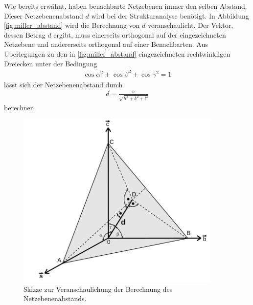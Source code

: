 Wie bereits erwähnt, haben benachbarte Netzebenen immer
den selben Abstand. Dieser Netzebenenabstand $d$ wird bei der
Strukturanalyse benötigt. In Abbildung \ref{fig:miller_abstand} wird
die Berechnung von $d$ veranschaulicht. Der Vektor, dessen Betrag $d$ ergibt,
muss einerseits orthogonal auf der eingezeichneten Netzebene und andererseits orthogonal
auf einer Benachbarten. Aus Überlegungen zu den in \ref{fig:miller_abstand}
eingezeichneten rechtwinkligen Dreiecken unter der Bedingung
\begin{align}
  \label{eqn:4}
  \cos\alpha^2 + \cos\beta^2 + \cos\gamma^2 = 1
\end{align}
lässt sich der Netzebenenabstand
durch
\begin{align}
  \label{eqn:5}
  d = \frac{a}{\sqrt{h^2 + k^2 + l^2}}
\end{align}
berechnen.

\begin{figure}[hhh]
  \centering
  \includegraphics[width=0.9\textwidth]{abbildungen/miller_dist.png}
  \caption{Skizze zur Veranschaulichung der Berechnung des Netzebenenabstands.\cite{sample}}
\end{figure}

